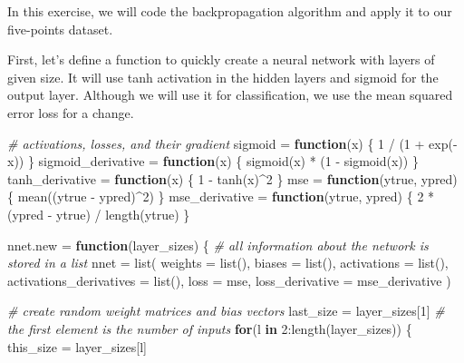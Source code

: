 \documentclass[
  a4paper,
]{article}
\newenvironment{Shaded}{\begin{snugshade}}{\end{snugshade}}
\newcommand{\AttributeTok}[1]{\textcolor[rgb]{0.77,0.63,0.00}{#1}}
\newcommand{\CommentTok}[1]{\textcolor[rgb]{0.56,0.35,0.01}{\textit{#1}}}
\newcommand{\ControlFlowTok}[1]{\textcolor[rgb]{0.13,0.29,0.53}{\textbf{#1}}}
\newcommand{\DecValTok}[1]{\textcolor[rgb]{0.00,0.00,0.81}{#1}}
\newcommand{\FunctionTok}[1]{\textcolor[rgb]{0.00,0.00,0.00}{#1}}
\newcommand{\NormalTok}[1]{#1}
\newcommand{\OtherTok}[1]{\textcolor[rgb]{0.56,0.35,0.01}{#1}}
\newcommand{\SpecialCharTok}[1]{\textcolor[rgb]{0.00,0.00,0.00}{#1}}
\begin{document}
In this exercise, we will code the backpropagation algorithm and apply
it to our five-points dataset.

First, let's define a function to quickly create a neural network with
layers of given size. It will use tanh activation in the hidden layers
and sigmoid for the output layer. Although we will use it for
classification, we use the mean squared error loss for a change.

\begin{Shaded}
\begin{Highlighting}[]
\CommentTok{\# activations, losses, and their gradient}
\NormalTok{sigmoid }\OtherTok{=} \ControlFlowTok{function}\NormalTok{(x) \{ }\DecValTok{1} \SpecialCharTok{/}\NormalTok{ (}\DecValTok{1} \SpecialCharTok{+} \FunctionTok{exp}\NormalTok{(}\SpecialCharTok{{-}}\NormalTok{x)) \}}
\NormalTok{sigmoid\_derivative }\OtherTok{=} \ControlFlowTok{function}\NormalTok{(x) \{ }\FunctionTok{sigmoid}\NormalTok{(x) }\SpecialCharTok{*}\NormalTok{ (}\DecValTok{1} \SpecialCharTok{{-}} \FunctionTok{sigmoid}\NormalTok{(x)) \}}
\NormalTok{tanh\_derivative }\OtherTok{=} \ControlFlowTok{function}\NormalTok{(x) \{ }\DecValTok{1} \SpecialCharTok{{-}} \FunctionTok{tanh}\NormalTok{(x)}\SpecialCharTok{\^{}}\DecValTok{2}\NormalTok{ \}}
\NormalTok{mse }\OtherTok{=} \ControlFlowTok{function}\NormalTok{(ytrue, ypred) \{ }\FunctionTok{mean}\NormalTok{((ytrue }\SpecialCharTok{{-}}\NormalTok{ ypred)}\SpecialCharTok{\^{}}\DecValTok{2}\NormalTok{) \}}
\NormalTok{mse\_derivative }\OtherTok{=} \ControlFlowTok{function}\NormalTok{(ytrue, ypred) \{ }\DecValTok{2} \SpecialCharTok{*}\NormalTok{ (ypred }\SpecialCharTok{{-}}\NormalTok{ ytrue) }\SpecialCharTok{/} \FunctionTok{length}\NormalTok{(ytrue) \}}


\NormalTok{nnet.new }\OtherTok{=} \ControlFlowTok{function}\NormalTok{(layer\_sizes) \{}
  \CommentTok{\# all information about the network is stored in a list}
\NormalTok{  nnet }\OtherTok{=} \FunctionTok{list}\NormalTok{(}
    \AttributeTok{weights =} \FunctionTok{list}\NormalTok{(),}
    \AttributeTok{biases =} \FunctionTok{list}\NormalTok{(),}
    \AttributeTok{activations =} \FunctionTok{list}\NormalTok{(),}
    \AttributeTok{activations\_derivatives =} \FunctionTok{list}\NormalTok{(),}
    \AttributeTok{loss =}\NormalTok{ mse,}
    \AttributeTok{loss\_derivative =}\NormalTok{ mse\_derivative}
\NormalTok{  )}
  
  \CommentTok{\# create random weight matrices and bias vectors}
\NormalTok{  last\_size }\OtherTok{=}\NormalTok{ layer\_sizes[}\DecValTok{1}\NormalTok{]  }\CommentTok{\# the first element is the number of inputs}
  \ControlFlowTok{for}\NormalTok{(l }\ControlFlowTok{in} \DecValTok{2}\SpecialCharTok{:}\FunctionTok{length}\NormalTok{(layer\_sizes)) \{}
\NormalTok{    this\_size }\OtherTok{=}\NormalTok{ layer\_sizes[l]}
    

\end{Highlighting}
\end{Shaded}
\end{document}
